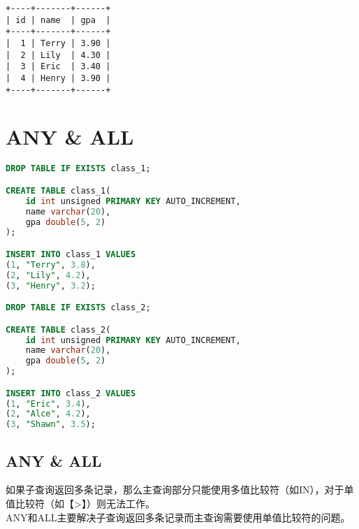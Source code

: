 \documentclass[12pt, openany, oneside]{book}
\begin{document}
\begin{tcolorbox}
	\begin{verbatim}
+----+-------+------+
| id | name  | gpa  |
+----+-------+------+
|  1 | Terry | 3.90 |
|  2 | Lily  | 4.30 |
|  3 | Eric  | 3.40 |
|  4 | Henry | 3.90 |
+----+-------+------+
	\end{verbatim}
\end{tcolorbox}

\newpage

\chapter{ANY \& ALL}

\vspace{0.5cm}


\begin{lstlisting}[language=SQL]
DROP TABLE IF EXISTS class_1;

CREATE TABLE class_1(
    id int unsigned PRIMARY KEY AUTO_INCREMENT,
    name varchar(20),
    gpa double(5, 2)
);

INSERT INTO class_1 VALUES
(1, "Terry", 3.8),
(2, "Lily", 4.2),
(3, "Henry", 3.2);

DROP TABLE IF EXISTS class_2;

CREATE TABLE class_2(
    id int unsigned PRIMARY KEY AUTO_INCREMENT,
    name varchar(20),
    gpa double(5, 2)
);

INSERT INTO class_2 VALUES
(1, "Eric", 3.4),
(2, "Alce", 4.2),
(3, "Shawn", 3.5);
\end{lstlisting}

\vspace{0.5cm}

\section{ANY \& ALL}

如果子查询返回多条记录，那么主查询部分只能使用多值比较符（如IN），对于单值比较符（如【>】）则无法工作。\\

ANY和ALL主要解决子查询返回多条记录而主查询需要使用单值比较符的问题。

\begin{table}[H]
	\centering
	\caption{ANY \& ALL}
\end{table}
\end{document}
